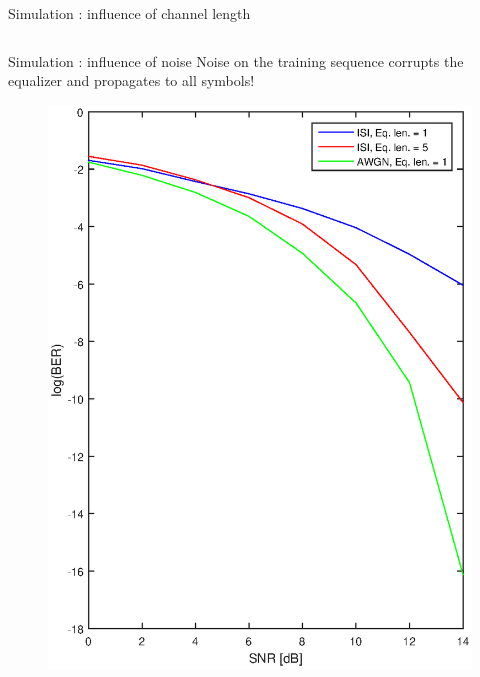\documentclass{beamer}
\begin{document}
\begin{frame}{Simulation : influence of channel length}
\begin{figure}[h]
\begin{tabular}{ccc}
        \end{tabular}
    \end{figure}
\end{frame}

\begin{frame}{Simulation : influence of noise}
Noise on the training sequence corrupts the equalizer and propagates to all symbols! 

\begin{figure}[h]
        \centering
        \includegraphics[scale = 0.4]{SNR1} 
            
    \end{figure}

\end{frame}
\end{document}
